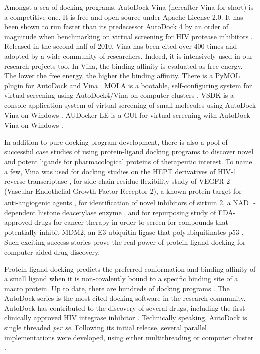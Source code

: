 Amongst a sea of docking programs, AutoDock Vina \citep{595} (hereafter Vina for short) is a competitive one. It is free and open source under Apache License 2.0. It has been shown to run faster than its predecessor AutoDock 4 \citep{596} by an order of magnitude when benchmarking on virtual screening for HIV protease inhibitors \citep{556}. Released in the second half of 2010, Vina has been cited over 400 times and adopted by a wide community of researchers. Indeed, it is intensively used in our research projects too. In Vina, the binding affinity is evaluated as free energy. The lower the free energy, the higher the binding affinity. There is a PyMOL plugin for AutoDock and Vina \citep{609}. MOLA is a bootable, self-configuring system for virtual screening using AutoDock4/Vina on computer clusters \citep{773}. VSDK is a console application system of virtual screening of small molecules using AutoDock Vina on Windows \citep{1268}. AUDocker LE is a GUI for virtual screening with AutoDock Vina on Windows \citep{1250}.%

In addition to pure docking program development, there is also a pool of successful case studies of using protein-ligand docking programs to discover novel and potent ligands for pharmacological proteins of therapeutic interest. To name a few, Vina was used for docking studies on the HEPT derivatives of HIV-1 reverse transcriptase \citep{843}, for side-chain residue flexibility study of VEGFR-2 (Vascular Endothelial Growth Factor Receptor 2), a known protein target for anti-angiogenic agents \citep{1084}, for identification of novel inhibitors of sirtuin 2, a NAD\textsuperscript{+}-dependent histone deacetylase enzyme \citep{1177}, and for repurposing study of FDA-approved drugs for cancer therapy in order to screen for compounds that potentially inhibit MDM2, an E3 ubiquitin ligase that polyubiquitinates p53 \citep{1230}. Such exciting success stories prove the real power of protein-ligand docking for computer-aided drug discovery.

Protein-ligand docking predicts the preferred conformation and binding affinity of a small ligand when it is non-covalently bound to a specific binding site of a macro protein. Up to date, there are hundreds of docking programs \citep{493,922}. The AutoDock series is the most cited docking software in the research community. AutoDock has contributed to the discovery of several drugs, including the first clinically approved HIV integrase inhibitor \citep{1169}. Technically speaking, AutoDock is single threaded \textit{per se}. Following its initial release, several parallel implementations were developed, using either multithreading or computer cluster \citep{115,560,782}.

